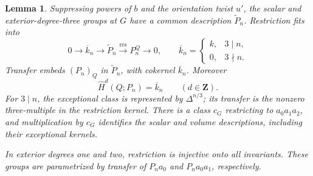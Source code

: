 \documentclass[11pt]{article}
\newtheorem{lemma}[theorem]{Lemma}
\theoremstyle{definition}
\theoremstyle{remark}
\numberwithin{equation}{section}
\begin{document}
\begin{lemma}\label{g:mackey}
Suppressing powers of $b$ and the orientation twist $u'$, the scalar
and exterior-degree-three groups at $G$ have a common description
$\widetilde P_n$.  Restriction fits into
\[
 0\longrightarrow \overline k_n\longrightarrow
 \widetilde P_n\xrightarrow{\operatorname{res}}P_n^Q
 \longrightarrow0,
 \qquad
 \overline k_n=
 \begin{cases}k,&3\mid n,\\0,&3\nmid n.
 \end{cases}
\]
Transfer embeds $(P_n)_Q$ in $\widetilde P_n$, with cokernel
$\overline k_n$.  Moreover
\begin{equation}\label{g:P-tate}
 \widehat H^d(Q;P_n)=\overline k_n
 \qquad(d\in\mathbf Z).
\end{equation}
For $3\mid n$, the exceptional class is represented by
$\Delta^{n/3}$; its transfer is the nonzero three-multiple in the
restriction kernel.  There is a class $c_G$ restricting to
$a_0a_1a_2$, and multiplication by $c_G$ identifies the scalar and
volume descriptions, including their exceptional kernels.

In exterior degrees one and two, restriction is injective onto all
invariants.  These groups are parametrized by transfer of
$P_na_0$ and $P_na_0a_1$, respectively.
\end{lemma}
\end{document}
